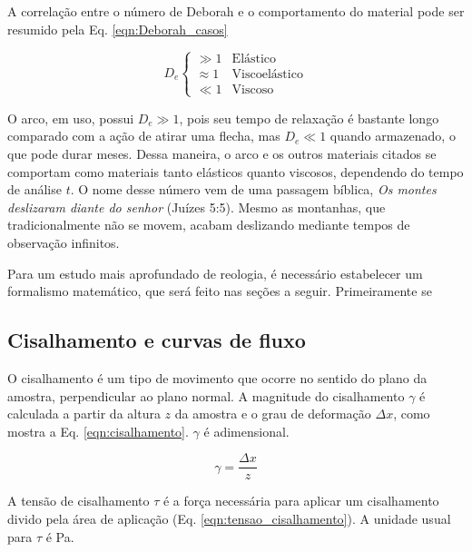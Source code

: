 		A correlação entre o número de Deborah e o comportamento do material pode ser resumido pela Eq. \ref{eqn:Deborah_casos}
		
		\begin{equation}
			D_e
			\begin{cases}
				\gg 1     & \textrm{Elástico}      \\
				\approx 1 & \textrm{Viscoelástico} \\
				\ll 1     & \textrm{Viscoso}
			\end{cases}
			\label{eqn:Deborah_casos}
		\end{equation}
		
		O arco, em uso, possui \(D_e\gg1\), pois seu tempo de relaxação é bastante longo comparado com a ação de atirar uma flecha, mas \(D_e\ll1\) quando armazenado, o que pode durar meses. Dessa maneira, o arco e os outros materiais citados se comportam como materiais tanto elásticos quanto viscosos, dependendo do tempo de análise \(t\). O nome desse número vem de uma passagem bíblica, \emph{Os montes deslizaram diante do senhor} (Juízes 5:5). Mesmo as montanhas, que tradicionalmente não se movem, acabam deslizando mediante tempos de observação infinitos.
		
		Para um estudo mais aprofundado de reologia, é necessário estabelecer um formalismo matemático, que será feito nas seções a seguir. Primeiramente se
		
			\subsection{Cisalhamento e curvas de fluxo}
			
			O cisalhamento é um tipo de movimento que ocorre no sentido do plano da amostra, perpendicular ao plano normal. A magnitude do cisalhamento \(\gamma\) é calculada a partir da altura \(z\) da amostra e o grau de deformação \(\Delta x\), como mostra a Eq. \ref{eqn:cisalhamento}. \(\gamma\) é adimensional.
			
			\begin{equation}  %
				\gamma = \frac{\Delta x}{z}
				\label{eqn:cisalhamento}
			\end{equation}
			
			A tensão de cisalhamento \(\tau\) é a força necessária para aplicar um cisalhamento divido pela área de aplicação (Eq. \ref{eqn:tensao_cisalhamento}). A unidade usual para \(\tau\) é Pa.
			
